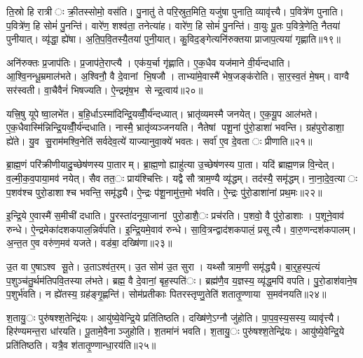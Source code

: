 ति॒स्रो हि रात्रीः क्री॒तस्सोमो॒ वस॑ति। पु॒नातु॑ ते परि॒स्रुत॒मिति॒ यजु॑षा पुनाति॒ व्यावृ॑त्त्यै। प॒वित्रे॑ण पुनाति। प॒वित्रे॑ण॒ हि सोमं॑ पु॒नन्ति॑। वारे॑ण॒ शश्व॑ता॒ तनेत्या॑ह। वारे॑ण॒ हि सोमं॑ पु॒नन्ति॑। वा॒युः पू॒तः प॒वित्रे॒णेति॒ नैतया॑ पुनीयात्। व्यृ॑द्धा॒ ह्ये॑षा। अ॒ति॒प॒वि॒तस्यै॒तया॑ पुनी॒यात्। कु॒विद॒ङ्गेत्यनि॑रुक्तया प्राजाप॒त्यया॑ गृह्णाति॥१९॥

अनि॑रुक्तः प्र॒जाप॑तिः। प्र॒जाप॑ते॒राप्त्यै। एक॑य॒र्चा गृ॑ह्णाति। ए॒क॒धैव यज॑माने वी॒र्य॑न्दधाति। आ॒श्वि॒नन्धू॒म्रमाल॑भते। अ॒श्विनौ॒ वै दे॒वानां भि॒षजौ। ताभ्या॑मे॒वास्मै॑ भेष॒जङ्क॑रोति। सा॒र॒स्व॒तं मे॒षम्। वाग्वै सर॑स्वती। वा॒चैवैनं॑ भिषज्यति। ऐ॒न्द्रमृ॑ष॒भ सेन्द्र॒त्वाय॑॥२०॥


यत्त्रि॒षु यूपेष्वा॒लभे॑त। ब॒हि॒र्धाऽस्मा॑दिन्द्रि॒यव्वीँ॒र्य॑न्दध्यात्। भ्रातृ॑व्यमस्मै जनयेत्। ए॒क॒यू॒प आल॑भते। ए॒क॒धैवास्मि॑न्निन्द्रि॒यव्वीँ॒र्य॑न्दधाति। नास्मै॒ भ्रातृ॑व्यञ्जनयति। नैतेषां पशू॒नां पु॑रो॒डाशा॑ भवन्ति। ग्रह॑पुरोडाशा॒ ह्ये॑ते। यु॒व सु॒राम॑मश्वि॒नेति॑ सर्वदेव॒त्ये॑ याज्यानुवा॒क्ये॑ भवतः। सर्वा॑ ए॒व दे॒वताः प्रीणाति॥२१॥

ब्रा॒ह्म॒णं परि॑क्रीणीयादु॒च्छेष॑णस्य पा॒तारम्। ब्रा॒ह्म॒णो ह्याहु॑त्या उ॒च्छेष॑णस्य पा॒ता। यदि॑ ब्राह्म॒णन्न वि॒न्देत्। व॒ल्मी॒क॒व॒पाया॒मव॑ नयेत्। सैव तत॒ः प्राय॑श्चित्तिः। यद्वै सौत्राम॒ण्यै व्यृ॑द्धम्। तद॑स्यै॒ समृ॑द्धम्। ना॒ना॒दे॒व॒त्याः प॒शव॑श्च पुरो॒डाशाश्च भवन्ति॒ समृ॑द्ध्यै। ऐ॒न्द्रः प॑शू॒नामु॑त्त॒मो भ॑वति। ऐ॒न्द्रः पु॑रो॒डाशा॑नां प्रथ॒मः॥२२॥

इ॒न्द्रि॒ये ए॒वास्मै॑ स॒मीची॑ दधाति। पु॒रस्ता॑दनूया॒जानां पुरो॒डाशै॒ः प्रच॑रति। प॒शवो॒ वै पु॑रो॒डाशाः। प॒शूने॒वाव॑ रुन्धे। ऐ॒न्द्रमेका॑दशकपाल॒न्निर्व॑पति। इ॒न्द्रि॒यमे॒वाव॑ रुन्धे। सा॒वि॒त्रन्द्वाद॑शकपालं॒ प्रसूत्यै। वा॒रु॒णन्दश॑कपालम्। अ॒न्त॒त ए॒व वरु॑ण॒मव॑ यजते। वड॑बा॒ दख्षि॑णा॥२३॥

उ॒त वा ए॒षाऽश्व सू॒ते। उ॒ताऽश्व॑त॒रम्। उ॒त सोम॑ उ॒त सुरा। यथ्सौत्राम॒णी समृ॑द्ध्यै। बा॒र्॒ह॒स्प॒त्यं प॒शुञ्च॑तु॒र्थम॑तिपवि॒तस्या ल॑भते। ब्रह्म॒ वै दे॒वानां॒ बृह॒स्पति॑ः। ब्रह्म॑णै॒व य॒ज्ञस्य॒ व्यृ॑द्ध॒मपि॑ वपति। पु॒रो॒डाश॑वाने॒ष प॒शुर्भ॑वति। न ह्ये॑तस्य॒ ग्रह॑ङ्गृ॒ह्णन्ति॑। सोम॑प्रतीकाः पितरस्तृप्णु॒तेति॑ शतातृ॒ण्णाया स॒मव॑नयति॥२४॥

श॒तायु॒ः पुरु॑षश्श॒तेन्द्रि॑यः। आयु॑ष्ये॒वेन्द्रि॒ये प्रति॑तिष्ठति। दख्षि॑णे॒ऽग्नौ जु॑होति। पा॒प॒व॒स्य॒सस्य॒ व्यावृ॑त्त्यै। हिर॑ण्यमन्त॒रा धा॑रयति। पू॒तामे॒वैनाञ्जुहोति। श॒तमा॑नं भवति। श॒तायु॒ः पुरु॑षश्श॒तेन्द्रि॑यः। आयु॑ष्ये॒वेन्द्रि॒ये प्रति॑तिष्ठति। यत्रै॒व श॑तातृ॒ण्णान्धा॒रय॑ति॥२५॥

